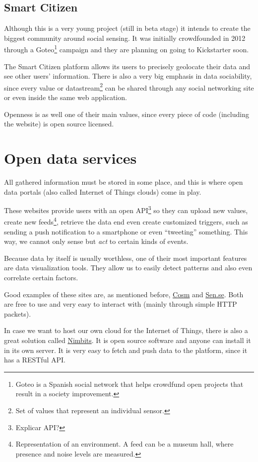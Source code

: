 \subsection{Smart Citizen}

Although this is a very young project (still in beta stage) it intends to create the biggest community around social sensing. It was initially crowdfounded in 2012 through a Goteo\footnote{Goteo is a Spanish social network that helps crowdfund open projects that result in a society improvement.} campaign and they are planning on going to Kickstarter soon.

The Smart Citizen platform allows its users to precisely geolocate their data and see other users' information. There is also a very big emphasis in data sociability, since every value or datastream\footnote{Set of values that represent an individual sensor.} can be shared through any social networking site or even inside the same web application.

Openness is as well one of their main values, since every piece of code (including the website) is open source licensed.


\section{Open data services}

All gathered information must be stored in some place, and this is where open data portals (also called Internet of Things clouds) come in play. 

These websites provide users with an open API\footnote{Explicar API?} so they can upload new values, create new feeds\footnote{Representation of an environment. A feed can be a museum hall, where presence and noise levels are measured.}, retrieve the data end even create customized triggers, such as sending a push notification to a smartphone or even ``tweeting'' something. This way, we cannot only sense but \emph{act} to certain kinds of events.

Because data by itself is usually worthless, one of their most important features are data visualization tools. They allow us to easily detect patterns and also even correlate certain factors.


Good examples of these sites are, as mentioned before, \href{http://www.cosm.com}{Cosm} and \href{http://open.sen.se/}{Sen.se}. Both are free to use and very easy to interact with (mainly through simple HTTP packets).

In case we want to host our own cloud for the Internet of Things, there is also a great solution called \href{http://nimbits.com}{Nimbits}. It is open source software and anyone can install it in its own server. It is very easy to fetch and push data to the platform, since it has a RESTful API.
